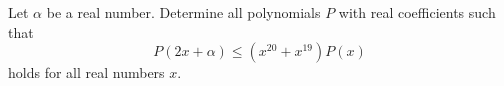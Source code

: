 Let $\alpha$ be a real number. Determine all polynomials $P$ with real coefficients such that $$P(2x+\alpha)\leq (x^{20}+x^{19})P(x)$$holds for all real numbers $x$.